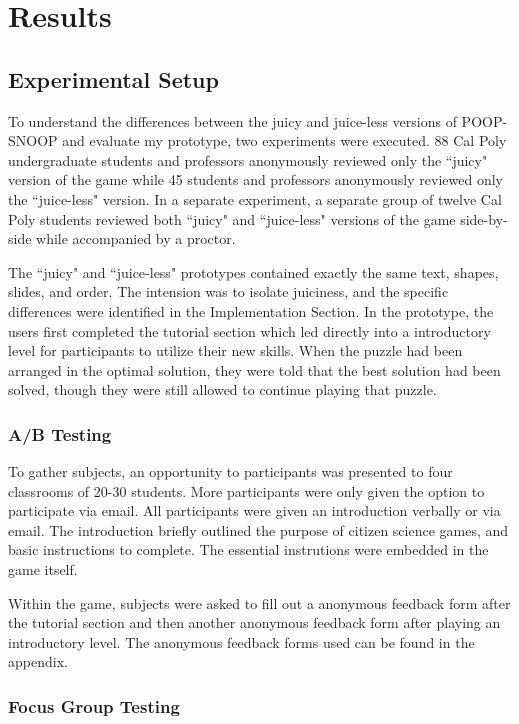\chapter{Results}

\section{Experimental Setup}

To understand the differences between the juicy and juice-less versions of POOP-SNOOP and evaluate my prototype, two experiments were executed. 88 Cal Poly undergraduate students and professors anonymously reviewed only the ``juicy" version of the game while 45 students and professors anonymously reviewed only the ``juice-less" version. In a separate experiment, a separate group of twelve Cal Poly students reviewed both ``juicy" and ``juice-less" versions of the game side-by-side while accompanied by a proctor.

The ``juicy" and ``juice-less" prototypes contained exactly the same text, shapes, slides, and order. The intension was to isolate juiciness, and the specific differences were identified in the Implementation Section. In the prototype, the users first completed the tutorial section which led directly into a introductory level for participants to utilize their new skills. When the puzzle had been arranged in the optimal solution, they were told that the best solution had been solved, though they were still allowed to continue playing that puzzle.

\subsection{A/B Testing}

To gather subjects, an opportunity to participants was presented to four classrooms of 20-30 students. More participants were only given the option to participate via email. All participants were given an introduction verbally or via email. The introduction briefly outlined the purpose of citizen science games, and basic instructions to complete. The essential instrutions were embedded in the game itself. 

Within the game, subjects were asked to fill out a anonymous feedback form after the tutorial section and then another anonymous feedback form after playing an introductory level. The anonymous feedback forms used can be found in the appendix.

\subsection{Focus Group Testing}

